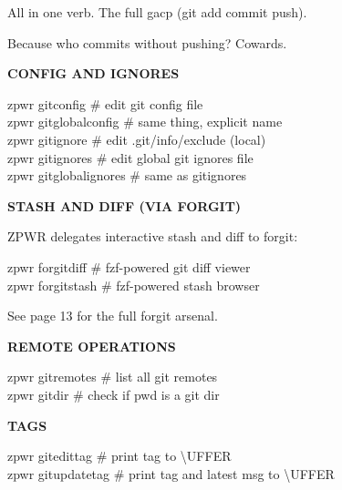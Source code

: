 \documentclass[11pt,a4paper,twoside]{book}
\begin{document}
All in one verb. The full gacp (git add commit push).

Because who commits without pushing? Cowards.


\vspace{12pt}
{\bfseries\color{neonyellow} CONFIG AND IGNORES}\vspace{4pt}

\begin{codebox}
zpwr gitconfig         \# edit git config file\\
zpwr gitglobalconfig   \# same thing, explicit name\\
zpwr gitignore         \# edit .git/info/exclude (local)\\
zpwr gitignores        \# edit global git ignores file\\
zpwr gitglobalignores  \# same as gitignores\\
\end{codebox}


\vspace{12pt}
{\bfseries\color{neonyellow} STASH AND DIFF (VIA FORGIT)}\vspace{4pt}

ZPWR delegates interactive stash and diff to forgit:

\begin{codebox}
zpwr forgitdiff        \# fzf-powered git diff viewer\\
zpwr forgitstash       \# fzf-powered stash browser\\
\end{codebox}

See page 13 for the full forgit arsenal.


\vspace{12pt}
{\bfseries\color{neonyellow} REMOTE OPERATIONS}\vspace{4pt}

\begin{codebox}
zpwr gitremotes        \# list all git remotes\\
zpwr gitdir            \# check if pwd is a git dir\\
\end{codebox}


\vspace{12pt}
{\bfseries\color{neonyellow} TAGS}\vspace{4pt}

\begin{codebox}
zpwr gitedittag        \# print tag to \textbackslash{}UFFER\\
zpwr gitupdatetag      \# print tag and latest msg to \textbackslash{}UFFER\\
\end{codebox}
\end{document}
